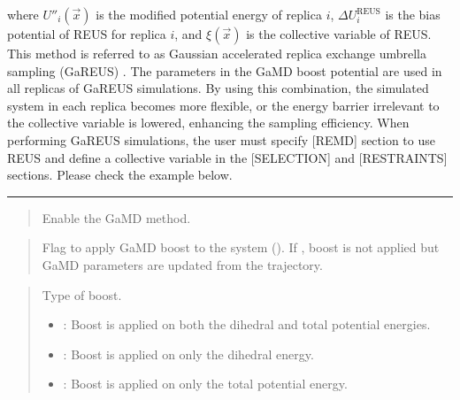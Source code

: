 \documentclass[a4paper,11pt,oneside,english]{sphinxmanual}
\begin{document}
where \(U''_i(\vec{x})\) is the modified potential energy of replica \(i\),
\(\Delta U_i^{\mathrm{REUS}}\) is the bias potential of REUS for replica \(i\), and
\(\xi(\vec{x})\) is the collective variable of REUS.
This method is referred to as Gaussian accelerated replica exchange umbrella sampling (GaREUS) .
The parameters in the GaMD boost potential are used in all replicas of GaREUS simulations.
By using this combination, the simulated system in each replica becomes more flexible, or the energy
barrier irrelevant to the collective variable is lowered, enhancing the sampling efficiency.
When performing GaREUS simulations, the user must specify {[}REMD{]} section to use REUS
and define a collective variable in the {[}SELECTION{]} and {[}RESTRAINTS{]} sections.
Please check the example below.


\bigskip\hrule\bigskip


 
\begin{quote}


Enable the GaMD method.
\end{quote}

 
\begin{quote}


Flag to apply GaMD boost to the system ().
If , boost is not applied but GaMD parameters
are updated from the trajectory.
\end{quote}

 
\begin{quote}


Type of boost.
\begin{itemize}
\item {} 
: Boost is applied on both the dihedral and total potential energies.

\item {} 
: Boost is applied on only the dihedral energy.

\item {} 
: Boost is applied on only the total potential energy.

\end{itemize}
\end{quote}
\end{document}
